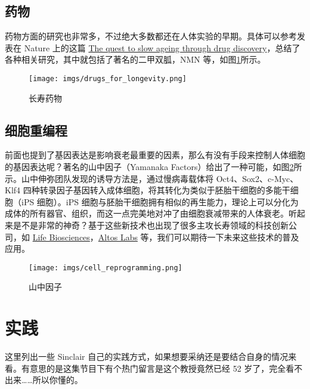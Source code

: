\documentclass{report}
\begin{document}
\subsection{药物}

药物方面的研究也非常多，不过绝大多数都还在人体实验的早期。具体可以参考发表在 Nature 上的这篇 \href{https://www.nature.com/articles/s41573-020-0067-7}{The quest to slow ageing through drug discovery}，总结了各种相关研究，其中就包括了著名的二甲双胍，NMN 等，如图\ref{fig:drugs}所示。

\begin{figure}[htpb]
    \centering
    \texttt{[image: imgs/drugs\_for\_longevity.png]}
    \caption{长寿药物}
    \label{fig:drugs}
\end{figure}

\subsection{细胞重编程}

前面也提到了基因表达是影响衰老最重要的因素，那么有没有手段来控制人体细胞的基因表达呢？著名的山中因子（Yamanaka Factors）给出了一种可能，如图\ref{fig:reprogramming}所示。山中伸弥团队发现的诱导方法是，通过慢病毒载体将 Oct4、Sox2、c-Myc、Klf4 四种转录因子基因转入成体细胞，将其转化为类似于胚胎干细胞的多能干细胞（iPS 细胞）。iPS 细胞与胚胎干细胞拥有相似的再生能力，理论上可以分化为成体的所有器官、组织，而这一点完美地对冲了由细胞衰减带来的人体衰老。听起来是不是非常的神奇？基于这些新技术也出现了很多主攻长寿领域的科技创新公司，如 \href{https://www.lifebiosciences.com/}{Life Biosciences}，\href{https://altoslabs.com/}{Altos Labs} 等，我们可以期待一下未来这些技术的普及应用。

\begin{figure}[htpb]
    \centering
    \texttt{[image: imgs/cell\_reprogramming.png]}
    \caption{山中因子}
    \label{fig:reprogramming}
\end{figure}

\section{实践}

这里列出一些 Sinclair 自己的实践方式，如果想要采纳还是要结合自身的情况来看。有意思的是这集节目下有个热门留言是这个教授竟然已经 52 岁了，完全看不出来……所以你懂的。
\end{document}
